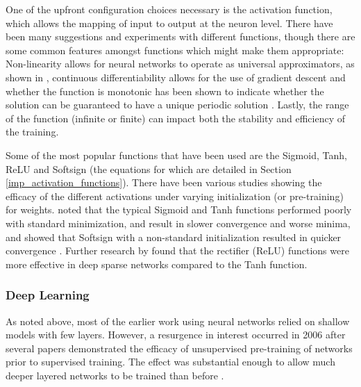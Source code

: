 \documentclass[a4paper,11pt,oneside]{article}
\theoremstyle{plain}
\theoremstyle{definition}
\begin{document}
	One of the upfront configuration choices necessary is the activation function, which allows the mapping of input 
	to output at the neuron level. There have been many suggestions and experiments with different functions, though 
	there are some common features amongst functions which might make them appropriate: Non-linearity allows for 
	neural networks to operate as universal approximators, as shown in \citep{Hornik}, continuous differentiability allows for the 
	use of gradient descent and whether the function is monotonic has been shown to indicate whether the solution 
	can be guaranteed to have a unique periodic solution \citep{Wu}. Lastly, the range of the function (infinite or finite) can impact both the 
	stability and efficiency of the training.
	\hfill \break 
	
	Some of the most popular functions that have been used are the Sigmoid, Tanh, ReLU and Softsign (the equations for which are detailed in Section \ref{imp_activation_functions}). There have 
	been various studies showing the efficacy of the different activations under varying initialization (or pre-training) 
	for weights. \citet{Glorot} noted that the typical Sigmoid and Tanh functions performed poorly with standard 
	minimization, and result in slower convergence and worse minima, and showed that Softsign with a non-standard 
	initialization resulted in quicker convergence . Further research by \citet{Glorot2} found that the 
	rectifier (ReLU) functions were more effective in deep sparse networks compared to the Tanh function.
	
	\subsubsection{Deep Learning}
	
	As noted above, most of the earlier work using neural networks relied on shallow models with few layers. 
	However, a resurgence in interest occurred in 2006 after several papers demonstrated the efficacy of 
	unsupervised pre-training of networks prior to supervised training. The effect was substantial enough to allow 
	much deeper layered networks to be trained than before \citep{Bengio1, Hinton1}.
	\hfill \break 
	
\end{document}
